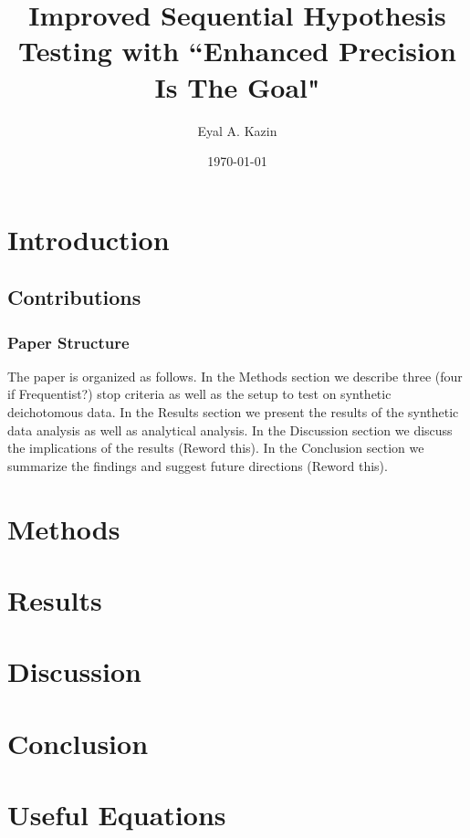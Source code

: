 \documentclass{article}
\title{Improved Sequential Hypothesis Testing with
``Enhanced Precision Is The Goal"}
\date{\today}
\author{Eyal A. Kazin}
\begin{document}
\maketitle



\section{Introduction}


\subsection{Contributions}

\subsubsection{Paper Structure}
The paper is organized as follows.
In the Methods section we describe three (four if Frequentist?)
stop criteria as well as the setup to test on synthetic deichotomous data.
In the Results section we present the results of the synthetic data analysis as well as analytical analysis.
In the Discussion section we discuss the implications of the results (Reword this).
In the Conclusion section we summarize the findings and suggest future directions (Reword this).


\section{Methods}



\section{Results}

\section{Discussion}

\section{Conclusion}

\section{Useful Equations}

\end{document}
